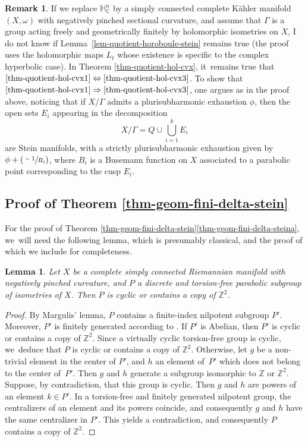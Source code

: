 \documentclass[11pt]{article}
\newcommand{\Psfrac}[2]{(\sfrac{#1}{#2})}
\newtheorem{lemma}[theorem]{Lemma}
\theoremstyle{definition}
\newtheorem*{remark}{Remark}
\newcommand{\C}{\mathbb{C}}
\newcommand{\Z}{\mathbb{Z}}
\newcommand{\HNC}{\mathbb{H}^{n}_{\C}}
\def\C{\mathbb{C}}
\newcommand{\HNC}{\mathbb{H}^{n}_{\C}}
\begin{document}
\begin{remark}
If we replace $\HNC$ by a simply connected complete Kähler manifold $(X,\omega)$ with negatively pinched sectional curvature, and assume that $\Gamma$ is a group acting freely and geometrically finitely by holomorphic isometries on $X$, I do not know if Lemma~\ref{lem-quotient-horoboule-stein} remains true (the proof uses the holomorphic maps $L_t$ whose existence is specific to the complex hyperbolic case). In Theorem \ref{thm-quotient-hol-cvx}, it~remains true that $\eqref{thm-quotient-hol-cvx1}\Leftrightarrow\eqref{thm-quotient-hol-cvx3}$. To show that $\eqref{thm-quotient-hol-cvx1}\Rightarrow\eqref{thm-quotient-hol-cvx3}$, one argues as in the proof above, noticing that if $X/\Gamma$ admits a plurisubharmonic exhaustion $\phi$, then the open sets $E_i$ appearing in the decomposition
\begin{equation*}
X/\Gamma = Q\cup\bigcup_{i=1}^{k}E_i
\end{equation*}
are Stein manifolds, with a strictly plurisubharmonic exhaustion given by $\phi+\Psfrac{-1}{B_i}$, where $B_i$ is a Busemann function on $X$ associated to a parabolic point corresponding to the cusp $E_i$.
\end{remark}

\subsection{Proof of Theorem \ref{thm-geom-fini-delta-stein}}

For the proof of Theorem \ref{thm-geom-fini-delta-stein}\eqref{thm-geom-fini-delta-steina}, we~will need the following lemma, which is presumably classical, and the proof of which we include for completeness.

\begin{lemma}\label{lem_grp_parab_cyclique_ou_Z2}
Let $X$ be a complete simply connected Riemannian manifold with negatively pinched curvature, and $P$ a discrete and torsion-free parabolic subgroup of isometries of $X$. Then $P$ is cyclic or contains a copy of $\Z^{2}$.
\end{lemma}

\begin{proof}
By Margulis' lemma, $P$ contains a finite-index nilpotent subgroup $P'$. Moreover, $P'$ is finitely generated according to \cite{bowditchDiscreteParabolicGroups1993}. If $P'$ is Abelian, then $P'$ is cyclic or contains a copy of $\Z^{2}$. Since a virtually cyclic torsion-free group is cyclic, we~deduce that $P$ is cyclic or contains a copy of $\Z^{2}$. Otherwise, let $g$ be a non-trivial element in the center of $P'$, and $h$ an element of~$P'$ which does not belong to the center of~$P'$. Then $g$ and $h$ generate a subgroup isomorphic to $\Z$ or $\Z^{2}$. Suppose, by contradiction, that this group is cyclic. Then $g$ and $h$ are powers of an element $k\in P'$. In a torsion-free and finitely generated nilpotent group, the centralizers of an element and its powers coincide, and consequently $g$ and $h$ have the same centralizer in $P'$. This yields a contradiction, and consequently $P$ contains a copy of $\Z^{2}$.\qedhere
\end{proof}
\end{document}
